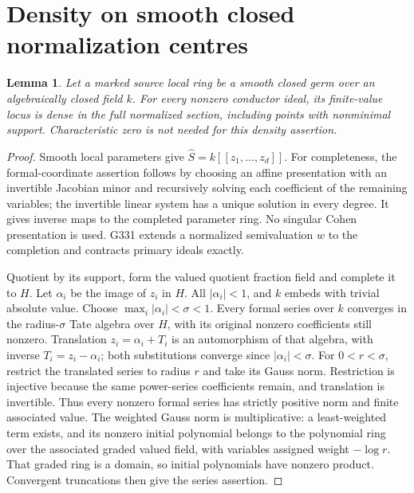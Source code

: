 \documentclass[11pt]{article}
\newtheorem{lemma}[theorem]{Lemma}
\begin{document}
\section{Density on smooth closed normalization centres}
\begin{lemma}\label{density}
Let a marked source local ring be a smooth closed germ over an
algebraically closed field $k$. For every nonzero conductor ideal,
its finite-value locus is dense in the full normalized section,
including points with nonminimal support. Characteristic zero is not
needed for this density assertion.
\end{lemma}
\begin{proof}
Smooth local parameters give $\widehat S=k[[z_1,\ldots,z_d]]$.
For completeness, the formal-coordinate assertion follows by choosing
an affine presentation with an invertible Jacobian minor and recursively
solving each coefficient of the remaining variables; the invertible
linear system has a unique solution in every degree. It gives inverse
maps to the completed parameter ring. No singular Cohen presentation
is used. G331 extends a normalized semivaluation $w$ to the completion
and contracts primary ideals exactly.

Quotient by its support, form the valued quotient fraction field and
complete it to $H$. Let $\alpha_i$ be the image of $z_i$ in $H$.
All $|\alpha_i|<1$, and $k$ embeds with trivial absolute value.
Choose $\max_i|\alpha_i|<\sigma<1$. Every formal series over $k$
converges in the radius-$\sigma$ Tate algebra over $H$, with its original
nonzero coefficients still nonzero. Translation $z_i=\alpha_i+T_i$ is
an automorphism of that algebra, with inverse $T_i=z_i-\alpha_i$;
both substitutions converge since $|\alpha_i|<\sigma$.
For $0<r<\sigma$, restrict the translated series to radius $r$ and
take its Gauss norm. Restriction is injective because the same power-series
coefficients remain, and translation is invertible. Thus every nonzero
formal series has strictly positive norm and finite associated value.
The weighted Gauss norm is multiplicative: a least-weighted term exists,
and its nonzero initial polynomial belongs to the polynomial ring over
the associated graded valued field, with variables assigned weight
$-\log r$. That graded ring is a domain, so initial polynomials have
nonzero product. Convergent truncations then give the series assertion.


\end{proof}
\end{document}
